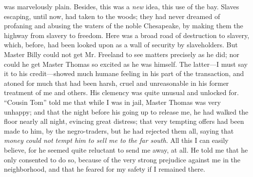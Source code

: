 was marvelously plain. Besides, this was a \emph{new} idea, this use of
the bay. Slaves escaping, until now, had taken to the woods; they had
never dreamed of profaning and abusing the waters of the noble
Chesapeake, by making them the highway from slavery to freedom. Here was
a broad road of destruction to slavery, which, before, had been looked
upon as a wall of security by slaveholders. But Master Billy could not
get Mr. Freeland to see matters precisely as he did; nor could he get
Master Thomas so excited as he was himself. The latter---I must say it
to his credit---showed much humane feeling in his part of the
transaction, and atoned for much that had been harsh, cruel and
unreasonable in his former treatment of me and others. His clemency was
quite unusual and unlocked for. ``Cousin Tom'' told me that while I was
in jail, Master Thomas was very unhappy; and that the night before his
going up to release me, he had walked the floor nearly all night,
evincing great distress; that very tempting offers had been made to him,
by the negro-traders, but he had rejected them all, saying that
\emph{money could not tempt him to sell me to the far south}. All this I
can easily believe, for he seemed quite reluctant to send me away, at
all. He told me that he only consented to do so, because of the very
strong prejudice against me in the neighborhood, and that he feared for
my safety if I remained there.

